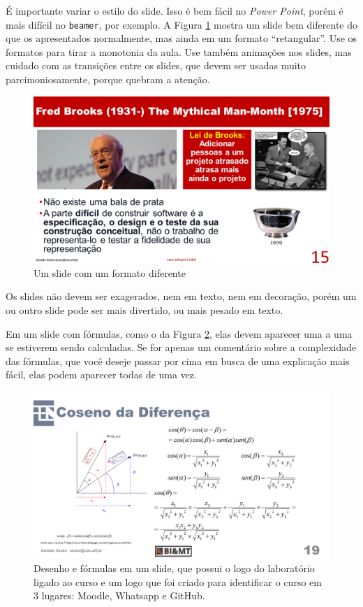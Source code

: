 É importante variar o estilo do slide. Isso é bem fácil no \textit{Power Point}, porém é mais difícil no \texttt{beamer}, por exemplo. A Figura \ref{fig:man} mostra um slide bem diferente do que os apresentados normalmente, mas ainda em um formato ``retangular''. Use os formatos para tirar a monotonia da aula. Use também animações nos slides, mas cuidado com as transições entre os slides, que devem ser usadas muito parcimoniosamente, porque quebram a atenção.

\begin{figure}[htb]
    \centering
    \includegraphics[width=\tam\linewidth]{imagens/manmonth.png}
    \caption{Um slide com um formato diferente}
    \label{fig:man}
\end{figure}


Os slides não devem ser exagerados, nem em texto, nem em decoração, porém um ou outro slide pode ser mais divertido, ou mais pesado em texto.

Em um slide com fórmulas, como o da Figura \ref{fig:formulas}, elas devem aparecer uma a uma se estiverem sendo calculadas. Se for apenas um comentário sobre a complexidade das fórmulas, que você deseje passar por cima em busca de uma explicação mais fácil, elas podem aparecer todas de uma vez.

\begin{figure}[hbt]
    \centering
    \includegraphics[width=\tam\linewidth]{imagens/desenhoeformulas.png}
    \caption{Desenho e fórmulas em um slide, que possui o logo do laboratório ligado ao curso e um logo que foi criado para identificar o curso em 3 lugares: Moodle, Whatsapp e GitHub.}
    \label{fig:formulas}
\end{figure}





